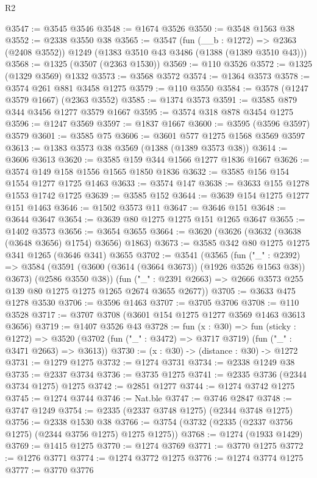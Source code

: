 \begin{lexlean}{R2}
\begin{coremodule}
@3547 := @3545 @3546
@3548 := @1674 @3526
@3550 := @3548 @1563 @38
@3552 := @2338 @3550 @38
@3565 := @3547
    (fun (__b : @1272) => @2363 (@2408 @3552))
    @1249
    (@1383 @3510 @43 @3486 (@1388 (@1389 @3510 @43)))
@3568 := @1325 (@3507 (@2363 @1530))
@3569 := @110 @3526
@3572 := @1325 (@1329 @3569) @1332
@3573 := @3568 @3572
@3574 := @1364 @3573
@3578 := @3574 @261 @881 @3458 @1275
@3579 := @110 @3550
@3584 := @3578 (@1247 @3579 @1667) (@2363 @3552)
@3585 := @1374 @3573
@3591 := @3585 @879 @344 @3456 @1277 @3579 @1667
@3595 := @3574 @318 @878 @3454 @1275
@3596 := @1247 @3569
@3597 := @1837 @1667
@3600 := @3595 (@3596 @3597) @3579
@3601 := @3585 @75
@3606 := @3601 @577 @1275 @1568 @3569 @3597
@3613 := @1383 @3573 @38 @3569 (@1388 (@1389 @3573 @38))
@3614 := @3606 @3613
@3620 := @3585 @159 @344 @1566 @1277 @1836 @1667
@3626 := @3574 @149 @158 @1556 @1565 @1850 @1836
@3632 := @3585 @156 @154 @1554 @1277 @1725 @1463
@3633 := @3574 @147
@3638 := @3633 @155 @1278 @1553 @1742 @1725
@3639 := @3585 @152
@3644 := @3639 @154 @1275 @1277 @151 @1463
@3646 := @1502 @3573 @11
@3647 := @3646 @151
@3648 := @3644 @3647
@3654 := @3639 @80 @1275 @1275 @151 @1265 @3647
@3655 := @1402 @3573
@3656 := @3654 @3655
@3664 := @3620 (@3626 (@3632 (@3638 (@3648 @3656) @1754) @3656) @1863)
@3673 := @3585 @342 @80 @1275 @1275 @341 @1265 (@3646 @341) @3655
@3702 := @3541
    (@3565
      (fun ("_" : @2392) =>
      @3584 (@3591 (@3600 (@3614 (@3664 @3673)) (@1926 @3526 @1563 @38)) @3673) (@2586 @3550 @38))
      (fun ("_" : @2391 @2663) => @2666 @3573 @255 @139 @80 @1275 @1275 @1265 @2674 @3655 @2677))
@3705 := @3633 @475 @1278 @3530
@3706 := @3596 @1463
@3707 := @3705 @3706
@3708 := @110 @3528
@3717 := @3707 @3708 (@3601 @154 @1275 @1277 @3569 @1463 @3613 @3656)
@3719 := @1407 @3526 @43
@3728 := fun (x : @30) =>
  fun (sticky : @1272) =>
  @3520 (@3702 (fun ("_" : @3472) => @3717 @3719) (fun ("_" : @3471 @2663) => @3613))
@3730 := (x : @30) -> (distance : @30) -> @1272
@3731 := @1279 @1275
@3732 := @1274 @3731
@3734 := @2338 @1249 @38
@3735 := @2337 @3734
@3736 := @3735 @1275
@3741 := @2335 @3736 (@2344 @3734 @1275) @1275
@3742 := @2851 @1277
@3744 := @1274 @3742 @1275
@3745 := @1274 @3744
@3746 := Nat.ble
@3747 := @3746 @2847
@3748 := @3747 @1249
@3754 := @2335 (@2337 @3748 @1275) (@2344 @3748 @1275)
@3756 := @2338 @1530 @38
@3766 := @3754 (@3732 (@2335 (@2337 @3756 @1275) (@2344 @3756 @1275) @1275 @1275))
@3768 := @1274 (@1933 @1429)
@3769 := @1415 @1275
@3770 := @1274 @3769
@3771 := @3770 @1275
@3772 := @1276 @3771
@3774 := @1274 @3772 @1275
@3776 := @1274 @3774 @1275
@3777 := @3770 @3776

\end{coremodule}
\end{lexlean}
